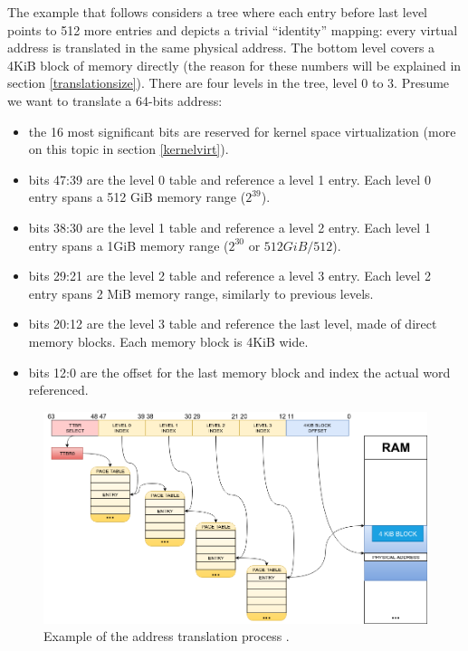 \documentclass[12pt,a4paper,openright,twoside]{report}
\begin{document}
The example that follows considers a tree where each entry before last level
points to 512 more entries and 
depicts a trivial ``identity'' mapping: every virtual address is translated in 
the same physical address. The bottom level covers a 4KiB block of memory directly
(the reason for these numbers will be explained in section \ref{translationsize}). There
are four levels in the tree, level 0 to 3.
Presume we want to translate a 64-bits address:
\begin{itemize}
    \item the 16 most significant bits are reserved for kernel space virtualization
        (more on this topic in section \ref{kernelvirt}).
    \item bits 47:39 are the level 0 table and reference a level 1 entry. Each
        level 0 entry spans a 512 GiB memory range ($2^39$).
    \item bits 38:30 are the level 1 table and reference a level 2 entry. Each
        level 1 entry spans a 1GiB memory range ($2^30$ or $512 GiB / 512$).
    \item bits 29:21 are the level 2 table and reference a level 3 entry. Each
        level 2 entry spans 2 MiB memory range, similarly to previous levels.
    \item bits 20:12 are the level 3 table and reference the last level, made of 
        direct memory blocks. Each memory block is 4KiB wide.
    \item bits 12:0 are the offset for the last memory block and index the actual
        word referenced.
\end{itemize}

 \begin{figure}[h]
 \includegraphics[scale=0.42]{images/tesi15.png} 
 \caption[Address Translation Example]{ Example of the address translation process .}\label{fig:translation}
 \end{figure}
\end{document}
